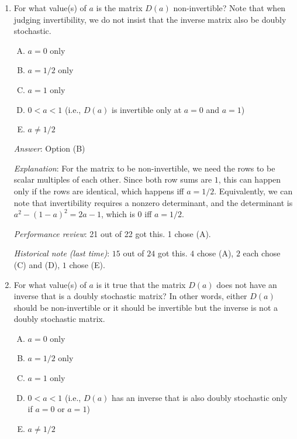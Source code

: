 \documentclass[10pt]{amsart}
\begin{document}
\begin{enumerate}
  {\em Performance review}: 20 out of 22 got this. 1 each chose (A) and (D).

  {\em Historical note (last time)}: $19$ out of $24$ got this. $2$ chose (B),
  $1$ each chose (A), (C), and (D).

\item For what value(s) of $a$ is the matrix $D(a)$ non-invertible?
  Note that when judging invertibility, we do not insist that the
  inverse matrix also be doubly stochastic.

  \begin{enumerate}[(A)]
  \item $a = 0$ only
  \item $a = 1/2$ only
  \item $a = 1$ only
  \item $0 < a < 1$ (i.e., $D(a)$ is invertible only at $a = 0$ and $a
    = 1$)
  \item $a \ne 1/2$
  \end{enumerate}

  {\em Answer}: Option (B)

  {\em Explanation}: For the matrix to be non-invertible, we need the
  rows to be scalar multiples of each other. Since both row sums are
  $1$, this can happen only if the rows are identical, which happens
  iff $a = 1/2$. Equivalently, we can note that invertibility requires
  a nonzero determinant, and the determinant is $a^2 - (1 - a)^2 = 2a -
  1$, which is $0$ iff $a = 1/2$.

  {\em Performance review}: 21 out of 22 got this. 1 chose (A).

  {\em Historical note (last time)}: $15$ out of $24$ got this. $4$ chose (A),
  $2$ each chose (C) and (D), $1$ chose (E).


\item For what value(s) of $a$ is it true that the matrix $D(a)$ does
  not have an inverse that is a doubly stochastic matrix? In other
  words, either $D(a)$ should be non-invertible or it should be
  invertible but the inverse is not a doubly stochastic matrix.

  \begin{enumerate}[(A)]
  \item $a = 0$ only
  \item $a = 1/2$ only
  \item $a = 1$ only
  \item $0 < a < 1$ (i.e., $D(a)$ has an inverse that is also doubly
    stochastic only if $a = 0$ or $a = 1$)
  \item $a \ne 1/2$
  \end{enumerate}


\end{enumerate}
\end{document}
